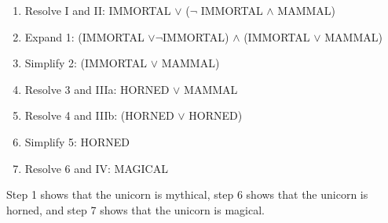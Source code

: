\documentclass[10.5pt,letterpaper]{article}
\begin{document}
\begin{enumerate}[label=\textbf{Problem \arabic*.}]
\begin{enumerate}[label=(\alph*)]
				\begin{enumerate}[label=\arabic*)]
					\item Resolve I and II: IMMORTAL $\lor$ ($\neg$ IMMORTAL $\land$ MAMMAL)
					\item Expand 1: (IMMORTAL $\lor \neg$IMMORTAL) $\land$ (IMMORTAL $\lor$ MAMMAL)
					\item Simplify 2: (IMMORTAL $\lor$ MAMMAL)
					\item Resolve 3 and IIIa: HORNED $\lor$ MAMMAL
					\item Resolve 4 and IIIb: (HORNED $\lor$ HORNED)
					\item Simplify 5: HORNED
					\item Resolve 6 and IV: MAGICAL
				\end{enumerate}
			\end{enumerate}
			Step 1 shows that the unicorn is mythical, step 6 shows that the unicorn is horned, and step 7 shows that the unicorn is magical.
\end{enumerate}
\end{document}
